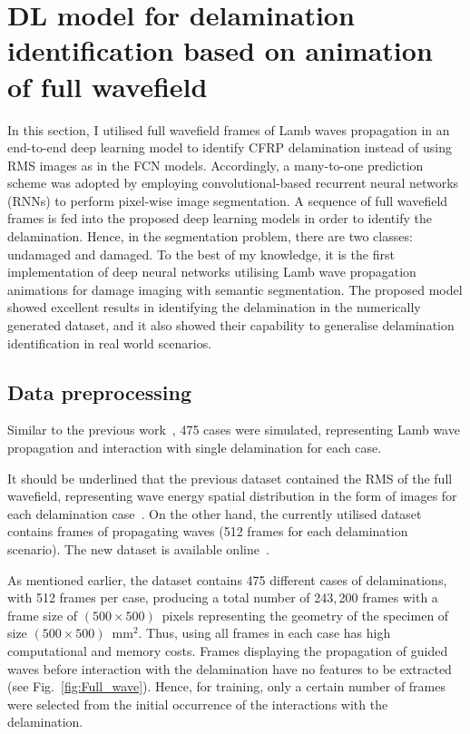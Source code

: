 \section{DL model for delamination identification based on animation of full wavefield}
\label{sec44}
In this section, I utilised full wavefield frames of Lamb waves propagation in an end-to-end deep learning model to identify CFRP delamination instead of using RMS images as in the FCN models.
Accordingly, a many-to-one prediction scheme was adopted by employing convolutional-based recurrent neural networks (RNNs) to perform pixel-wise image segmentation.
A sequence of full wavefield frames is fed into the proposed deep learning models in order to identify the delamination.
Hence, in the segmentation problem, there are two classes: undamaged and damaged.
To the best of my knowledge, it is the first implementation of deep neural networks utilising Lamb wave propagation animations for damage imaging with semantic segmentation.
The proposed model showed excellent results in identifying the delamination in the numerically generated dataset, and it also showed their capability to generalise delamination identification in real world scenarios.
\subsection{Data preprocessing}
Similar to the previous work~\cite{Ijjeh2021}, 475 cases were simulated, representing Lamb wave propagation and interaction with single delamination for each case. 

It should be underlined that the previous dataset contained the RMS of the full wavefield, representing wave energy spatial distribution in the form of images for each delamination case~\cite{Kudela2020d}.
On the other hand, the currently utilised dataset contains frames of propagating waves (512 frames for each delamination scenario).
The new dataset is available online~\cite{Kudela2021}.

As mentioned earlier, the dataset contains 475 different cases of delaminations, with 512 frames per case, producing a total number of 243,\,200 frames with a frame size of \((500\times500)\)~pixels representing the geometry of the specimen of size \((500\times500)\)~mm\(^{2}\).
Thus, using all frames in each case has high computational and memory costs.
Frames displaying the propagation of guided waves before interaction with the delamination have no features to be extracted (see Fig.~\ref{fig:Full_wave}).
Hence, for training, only a certain number of frames were selected from the initial occurrence of the interactions with the delamination.

